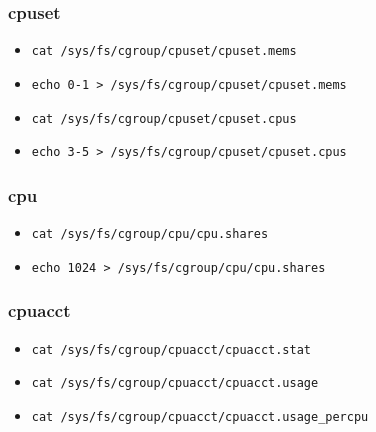 \documentclass{beamer}
\begin{document}
\begin{frame}[fragile]
    \frametitle{cpuset}
    \begin{itemize}
        \item \verb|cat /sys/fs/cgroup/cpuset/cpuset.mems|
        \item \verb|echo 0-1 > /sys/fs/cgroup/cpuset/cpuset.mems|
        \item \verb|cat /sys/fs/cgroup/cpuset/cpuset.cpus|
        \item \verb|echo 3-5 > /sys/fs/cgroup/cpuset/cpuset.cpus|
    \end{itemize}
\end{frame}

\begin{frame}[fragile]
    \frametitle{cpu}
    \begin{itemize}
        \item \verb|cat /sys/fs/cgroup/cpu/cpu.shares|
        \item \verb|echo 1024 > /sys/fs/cgroup/cpu/cpu.shares|
    \end{itemize}
\end{frame}

\begin{frame}[fragile]
    \frametitle{cpuacct}
    \begin{itemize}
        \item \verb|cat /sys/fs/cgroup/cpuacct/cpuacct.stat|
        \item \verb|cat /sys/fs/cgroup/cpuacct/cpuacct.usage|
        \item \verb|cat /sys/fs/cgroup/cpuacct/cpuacct.usage_percpu|
    \end{itemize}
\end{frame}
\end{document}
